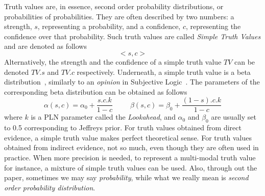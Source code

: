 \documentclass[runningheads]{llncs}
\newcommand{\TEval}{\textit{Evaluation}}
\newcommand{\TLamb}{\textit{Lambda}}
\newcommand{\TAnd}{\textit{And}}
\newcommand{\TOr}{\textit{Or}}
\newcommand{\TNot}{\textit{Not}}
\newcommand{\TImpl}{\textit{Implication}}
\newcommand{\TTV}{\textit{TV}}
\begin{document}
Truth values are, in essence, second order probability distributions,
or probabilities of probabilities.  They are often described by two
numbers: a strength, $s$, representing a probability, and a
confidence, $c$, representing the confidence over that probability.
Such truth values are called \emph{Simple Truth Values} and are
denoted as follows
$$<\!s, c\!>$$
Alternatively, the strength and the confidence of a simple truth value
$\TTV$ can be denoted $\TTV.s$ and $\TTV.c$ respectively.  Underneath,
a simple truth value is a beta distribution~\cite{Abourizk94Fitting},
similarly to an \emph{opinion} in Subjective Logic~\cite{Josang2026}.
The parameters of the corresponding beta distribution can be obtained
as follows
$$\alpha(s, c)=\alpha_0 + \frac{s.c.k}{1-c}\ \ \ \ \ \ \ \ \ \ \
\beta(s, c)=\beta_0 + \frac{(1-s).c.k}{1-c}$$ where $k$ is a PLN
parameter called the \emph{Lookahead}, and $\alpha_0$ and $\beta_0$
are usually set to 0.5 corresponding to Jeffreys prior.  For truth
values obtained from direct evidence, a simple truth value makes
perfect theoretical sense.  For truth values obtained from indirect
evidence, not so much, even though they are often used in practice.
When more precision is needed, to represent a multi-modal truth value
for instance, a mixture of simple truth values can be used.  Also,
through out the paper, sometimes we may say \emph{probability}, while
what we really mean is \emph{second order probability distribution}.


\end{document}
